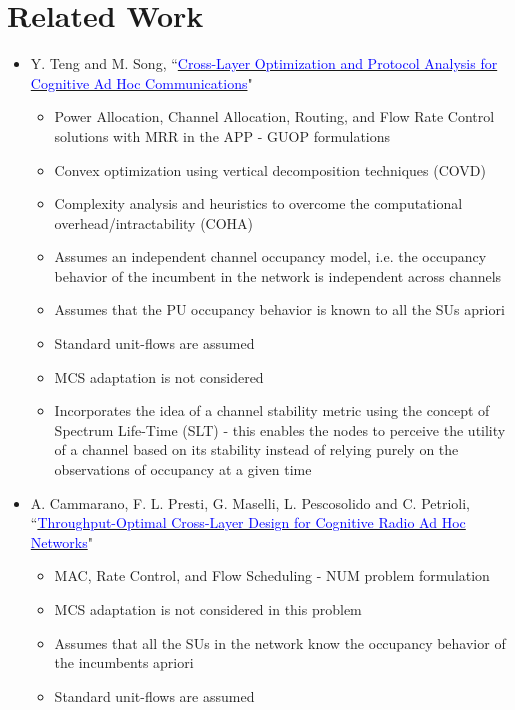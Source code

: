 \documentclass[12pt, draftcls, onecolumn]{IEEEtran}
\begin{document}
\section{Related Work}
\begin{itemize}
  \item Y. Teng and M. Song, ``\href{http://ieeexplore.ieee.org/stamp/stamp.jsp?tp=&arnumber=7859326&isnumber=7859429}{\textcolor{blue}{Cross-Layer Optimization and Protocol Analysis for Cognitive Ad Hoc Communications}}"
  \begin{itemize}
      \item Power Allocation, Channel Allocation, Routing, and Flow Rate Control solutions with MRR in the APP - GUOP formulations
      \item Convex optimization using vertical decomposition techniques (COVD)
      \item Complexity analysis and heuristics to overcome the computational overhead/intractability (COHA)
      \item Assumes an independent channel occupancy model, i.e. the occupancy behavior of the incumbent in the network is independent across channels
      \item Assumes that the PU occupancy behavior is known to all the SUs apriori
      \item Standard unit-flows are assumed
      \item MCS adaptation is not considered
      \item Incorporates the idea of a channel stability metric using the concept of Spectrum Life-Time (SLT) - this enables the nodes to perceive the utility of a channel based on its stability instead of relying purely on the observations of occupancy at a given time
  \end{itemize}
  \item A. Cammarano, F. L. Presti, G. Maselli, L. Pescosolido and C. Petrioli, ``\href{http://ieeexplore.ieee.org/stamp/stamp.jsp?tp=&arnumber=6881740&isnumber=7180482}{\textcolor{blue}{Throughput-Optimal Cross-Layer Design for Cognitive Radio Ad Hoc Networks}}"
  \begin{itemize}
      \item MAC, Rate Control, and Flow Scheduling - NUM problem formulation
      \item MCS adaptation is not considered in this problem
      \item Assumes that all the SUs in the network know the occupancy behavior of the incumbents apriori
      \item Standard unit-flows are assumed

\end{itemize}
\end{itemize}
\end{document}
